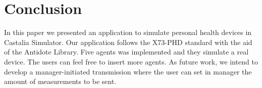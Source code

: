\section{Conclusion}\label{conclusion}
In this paper we presented an application to simulate personal health devices in Castalia Simulator. Our application follows the X73-PHD standard with the aid of the Antidote Library. Five agents was implemented and they simulate a real device. The users can feel free to insert more agents. As future work, we intend to develop a manager-initiated transmission where the user can set in manager the amount of measurements to be sent.